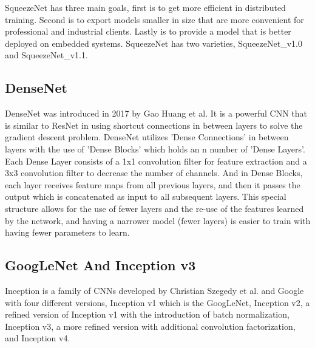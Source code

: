 \documentclass[conference]{IEEEtran}
\begin{document}
SqueezeNet has three main goals, first is to get more efficient in distributed training. Second is to export models smaller in size that are more convenient for professional and industrial clients. Lastly is to provide a model that is better deployed on embedded systems. SqueezeNet has two varieties, SqueezeNet\_v1.0 and SqueezeNet\_v1.1.

\subsection{DenseNet}
DenseNet was introduced in 2017 by Gao Huang et al. It is a powerful CNN that is similar to ResNet in using shortcut connections in between layers to solve the gradient descent problem. DenseNet utilizes 'Dense Connections' in between layers with the use of 'Dense Blocks' which holds an n number of 'Dense Layers'. Each Dense Layer consists of a 1x1 convolution filter for feature extraction and a 3x3 convolution filter to decrease the number of channels. And in Dense Blocks, each layer receives feature maps from all previous layers, and then it passes the output which is concatenated as input to all subsequent layers. This special structure allows for the use of fewer layers and the re-use of the features learned by the network, and having a narrower model (fewer layers) is easier to train with having fewer parameters to learn.



\subsection{GoogLeNet And Inception v3}
Inception\cite{szegedy2016rethinking}\cite{szegedy2015going}\cite{szegedy2016inception} is a family of CNNs developed by Christian Szegedy et al. and Google with four different versions, Inception v1 which is the GoogLeNet, Inception v2, a refined version of Inception v1 with the introduction of batch normalization, Inception v3, a more refined version with additional convolution factorization, and Inception v4.
\end{document}
